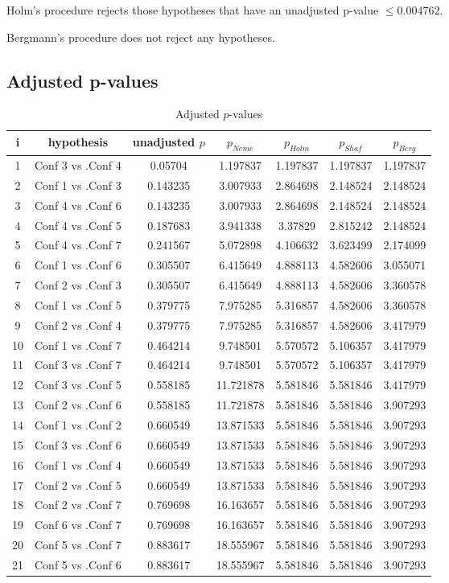 \documentclass[a4paper,10pt]{article}
\begin{document}
\begin{landscape}
Holm's procedure rejects those hypotheses that have an unadjusted p-value $\le0.004762$.

Bergmann's procedure does not reject any hypotheses.

\pagebreak

\subsection{Adjusted p-values}

\begin{table}[!htp]
\centering\scriptsize
\begin{tabular}{ccccccc}
i&hypothesis&unadjusted $p$&$p_{Neme}$&$p_{Holm}$&$p_{Shaf}$&$p_{Berg}$\\
\hline1&Conf 3 vs .Conf 4&0.05704&1.197837&1.197837&1.197837&1.197837\\
2&Conf 1 vs .Conf 3&0.143235&3.007933&2.864698&2.148524&2.148524\\
3&Conf 4 vs .Conf 6&0.143235&3.007933&2.864698&2.148524&2.148524\\
4&Conf 4 vs .Conf 5&0.187683&3.941338&3.37829&2.815242&2.148524\\
5&Conf 4 vs .Conf 7&0.241567&5.072898&4.106632&3.623499&2.174099\\
6&Conf 1 vs .Conf 6&0.305507&6.415649&4.888113&4.582606&3.055071\\
7&Conf 2 vs .Conf 3&0.305507&6.415649&4.888113&4.582606&3.360578\\
8&Conf 1 vs .Conf 5&0.379775&7.975285&5.316857&4.582606&3.360578\\
9&Conf 2 vs .Conf 4&0.379775&7.975285&5.316857&4.582606&3.417979\\
10&Conf 1 vs .Conf 7&0.464214&9.748501&5.570572&5.106357&3.417979\\
11&Conf 3 vs .Conf 7&0.464214&9.748501&5.570572&5.106357&3.417979\\
12&Conf 3 vs .Conf 5&0.558185&11.721878&5.581846&5.581846&3.417979\\
13&Conf 2 vs .Conf 6&0.558185&11.721878&5.581846&5.581846&3.907293\\
14&Conf 1 vs .Conf 2&0.660549&13.871533&5.581846&5.581846&3.907293\\
15&Conf 3 vs .Conf 6&0.660549&13.871533&5.581846&5.581846&3.907293\\
16&Conf 1 vs .Conf 4&0.660549&13.871533&5.581846&5.581846&3.907293\\
17&Conf 2 vs .Conf 5&0.660549&13.871533&5.581846&5.581846&3.907293\\
18&Conf 2 vs .Conf 7&0.769698&16.163657&5.581846&5.581846&3.907293\\
19&Conf 6 vs .Conf 7&0.769698&16.163657&5.581846&5.581846&3.907293\\
20&Conf 5 vs .Conf 7&0.883617&18.555967&5.581846&5.581846&3.907293\\
21&Conf 5 vs .Conf 6&0.883617&18.555967&5.581846&5.581846&3.907293\\
\hline
\end{tabular}
\caption{Adjusted $p$-values}
\end{table}

\end{landscape}
\end{document}
